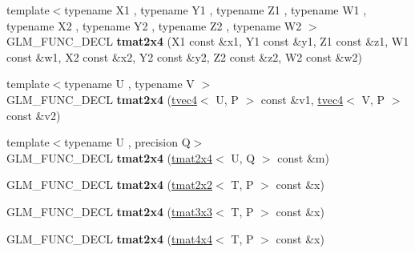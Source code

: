 \begin{DoxyCompactItemize}
\item 
{\footnotesize template$<$typename X1 , typename Y1 , typename Z1 , typename W1 , typename X2 , typename Y2 , typename Z2 , typename W2 $>$ }\\G\+L\+M\+\_\+\+F\+U\+N\+C\+\_\+\+D\+E\+CL {\bfseries tmat2x4} (X1 const \&x1, Y1 const \&y1, Z1 const \&z1, W1 const \&w1, X2 const \&x2, Y2 const \&y2, Z2 const \&z2, W2 const \&w2)\hypertarget{structglm_1_1detail_1_1tmat2x4_a062180e9aa13dc809833a430d28ac3df}{}\label{structglm_1_1detail_1_1tmat2x4_a062180e9aa13dc809833a430d28ac3df}

\item 
{\footnotesize template$<$typename U , typename V $>$ }\\G\+L\+M\+\_\+\+F\+U\+N\+C\+\_\+\+D\+E\+CL {\bfseries tmat2x4} (\hyperlink{structglm_1_1detail_1_1tvec4}{tvec4}$<$ U, P $>$ const \&v1, \hyperlink{structglm_1_1detail_1_1tvec4}{tvec4}$<$ V, P $>$ const \&v2)\hypertarget{structglm_1_1detail_1_1tmat2x4_a83ae4e28845c271611c3c4a41d9afb83}{}\label{structglm_1_1detail_1_1tmat2x4_a83ae4e28845c271611c3c4a41d9afb83}

\item 
{\footnotesize template$<$typename U , precision Q$>$ }\\G\+L\+M\+\_\+\+F\+U\+N\+C\+\_\+\+D\+E\+CL {\bfseries tmat2x4} (\hyperlink{structglm_1_1detail_1_1tmat2x4}{tmat2x4}$<$ U, Q $>$ const \&m)\hypertarget{structglm_1_1detail_1_1tmat2x4_a112e455f02edb2c42ef8c0ad72495a4e}{}\label{structglm_1_1detail_1_1tmat2x4_a112e455f02edb2c42ef8c0ad72495a4e}

\item 
G\+L\+M\+\_\+\+F\+U\+N\+C\+\_\+\+D\+E\+CL {\bfseries tmat2x4} (\hyperlink{structglm_1_1detail_1_1tmat2x2}{tmat2x2}$<$ T, P $>$ const \&x)\hypertarget{structglm_1_1detail_1_1tmat2x4_aef916b6a3c4b7957458c9b7bc5895841}{}\label{structglm_1_1detail_1_1tmat2x4_aef916b6a3c4b7957458c9b7bc5895841}

\item 
G\+L\+M\+\_\+\+F\+U\+N\+C\+\_\+\+D\+E\+CL {\bfseries tmat2x4} (\hyperlink{structglm_1_1detail_1_1tmat3x3}{tmat3x3}$<$ T, P $>$ const \&x)\hypertarget{structglm_1_1detail_1_1tmat2x4_a5b2e53893c5960805f0315217f4fc5e9}{}\label{structglm_1_1detail_1_1tmat2x4_a5b2e53893c5960805f0315217f4fc5e9}

\item 
G\+L\+M\+\_\+\+F\+U\+N\+C\+\_\+\+D\+E\+CL {\bfseries tmat2x4} (\hyperlink{structglm_1_1detail_1_1tmat4x4}{tmat4x4}$<$ T, P $>$ const \&x)\hypertarget{structglm_1_1detail_1_1tmat2x4_aab92f80bbe5811c595f4c55ed1c7d186}{}\label{structglm_1_1detail_1_1tmat2x4_aab92f80bbe5811c595f4c55ed1c7d186}


\end{DoxyCompactItemize}
